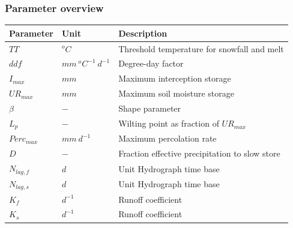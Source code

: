 \subsubsection{Parameter overview}
\begin{table}[htbp]
  \centering
    \begin{tabular}{lll}
    \toprule
    Parameter & Unit  & Description \\
    \midrule
    $TT$  & $^oC$ & Threshold temperature for snowfall and melt \\
    $ddf$ & $mm~^oC^{-1}~d^{-1}$ & Degree-day factor \\
    $I_{max}$ & $mm$  & Maximum interception storage \\
    $UR_{max}$ & $mm$  & Maximum soil moisture storage \\
    $\beta$ & $-$   & Shape parameter \\
    $L_p$ & $-$   & Wilting point as fraction of $UR_{max}$ \\
    $Perc_{max}$ & $mm~d^{-1}$ & Maximum percolation rate \\
    $D$   & $-$   & Fraction effective precipitation to slow store \\
    $N_{lag,f}$ & $d$   & Unit Hydrograph time base \\
    $N_{lag,s}$ & $d$   & Unit Hydrograph time base \\
    $K_f$ & $d^{-1}$ & Runoff coefficient \\
    $K_s$ & $d^{-1}$ & Runoff coefficient \\
    \bottomrule
    \end{tabular}%
  \label{tab:addlabel}%
\end{table}%

